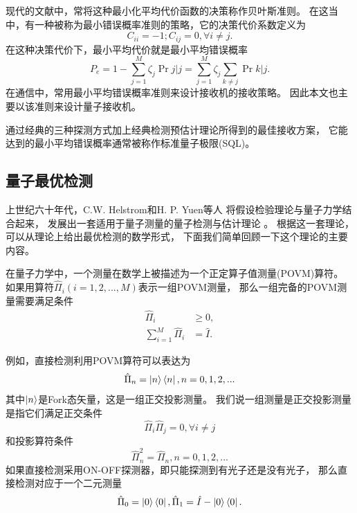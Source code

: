 现代的文献中，常将这种最小化平均代价函数的决策称作贝叶斯准则。
在这当中，有一种被称为最小错误概率准则的策略，它的决策代价系数定义为
\begin{equation}
C_{ii} = -1; C_{ij}=0, \forall i\neq j. 
\label{eq:min-err-cond}
\end{equation}
在这种决策代价下，最小平均代价就是最小平均错误概率
\begin{equation}
P_e = 1 - \sum_{j=1}^M \zeta_j \Pr{j|j} = \sum_{j=1}^M \zeta_j \sum_{k\neq j}\Pr{k|j}.
\end{equation}
在通信中，常用最小平均错误概率准则来设计接收机的接收策略。
因此本文也主要以该准则来设计量子接收机。

通过经典的三种探测方式加上经典检测预估计理论所得到的最佳接收方案，
它能达到的最小平均错误概率通常被称作标准量子极限(SQL)。




\subsection{量子最优检测}
上世纪六十年代，C.W. Helstrom和H. P. Yuen等人
将假设检验理论与量子力学结合起来，
发展出一套适用于量子测量的量子检测与估计理论
\cite{helstrom1976quantum,helstrom1967detection,yuen1975optimum}。
根据这一套理论，可以从理论上给出最优检测的数学形式，
下面我们简单回顾一下这个理论的主要内容。

在量子力学中，一个测量在数学上被描述为一个正定算子值测量(POVM)算符\cite{helstrom1976quantum}。
如果用算符$\hat{\Pi}_i (i=1,2,...,M)$表示一组POVM测量，
那么一组完备的POVM测量需要满足条件
\begin{equation}
\begin{split}
\hat{\Pi}_i & \ge 0, \\
\sum_{i=1}^M \hat{\Pi}_i & = \hat{I}.
\end{split}
\end{equation}

例如，直接检测利用POVM算符可以表达为
\begin{equation}
\hat{\Pi}_n = \ket{n}\bra{n}, n=0,1,2,...
\end{equation}
其中$\ket{n}$是Fork态矢量，这是一组正交投影测量。
我们说一组测量是正交投影测量是指它们满足正交条件
\begin{equation}
\hat{\Pi}_i \hat{\Pi}_j = 0, \forall i \neq j
\end{equation}
和投影算符条件
\begin{equation}
\hat{\Pi}_n^2 = \hat{\Pi}_n, n=0,1,2,...
\end{equation}
如果直接检测采用ON-OFF探测器，即只能探测到有光子还是没有光子，
那么直接检测对应于一个二元测量
\begin{equation}
\hat{\Pi}_0 = \ket{0}\bra{0}, \hat{\Pi}_1 = \hat{I} - \ket{0}\bra{0}.
\end{equation}


